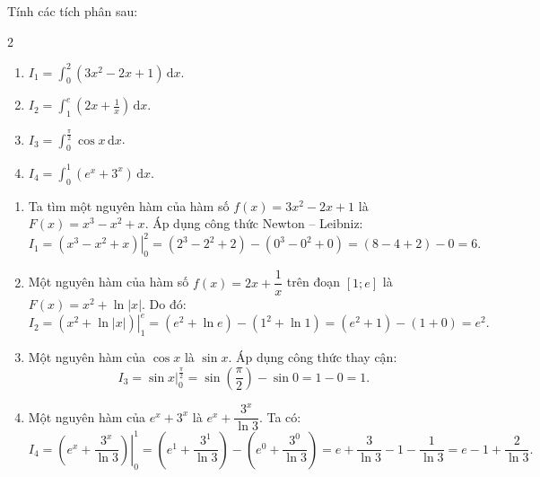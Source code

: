 \documentclass[12pt]{article}
\begin{document}
	
	\begin{vidu}
		Tính các tích phân sau:
		\begin{multicols}{2}
			\begin{enumerate}[label=\alph*)]
				\item $I_1 = \displaystyle \int_0^2 (3x^2 - 2x + 1)\,\mathrm{d}x$.
				\item $I_2 = \displaystyle \int_1^e \left( 2x + \frac{1}{x} \right)\,\mathrm{d}x$.
				\item $I_3 = \displaystyle \int_0^{\frac{\pi}{2}} \cos x\,\mathrm{d}x$.
				\item $I_4 = \displaystyle \int_0^1 (e^x + 3^x)\,\mathrm{d}x$.
			\end{enumerate}
		\end{multicols}
	\end{vidu}
	\begin{loigiai}
		\begin{enumerate}[label=\alph*)]
			\item Ta tìm một nguyên hàm của hàm số $f(x) = 3x^2 - 2x + 1$ là $F(x) = x^3 - x^2 + x$. Áp dụng công thức Newton -- Leibniz:
			\[
			I_1 = \left. (x^3 - x^2 + x) \right|_0^2 = (2^3 - 2^2 + 2) - (0^3 - 0^2 + 0) = (8 - 4 + 2) - 0 = 6.
			\]
			
			\item Một nguyên hàm của hàm số $f(x) = 2x + \dfrac{1}{x}$ trên đoạn $[1; e]$ là $F(x) = x^2 + \ln|x|$. Do đó:
			\[
			I_2 = \left. (x^2 + \ln|x|) \right|_1^e = (e^2 + \ln e) - (1^2 + \ln 1) = (e^2 + 1) - (1 + 0) = e^2.
			\]
			
			\item Một nguyên hàm của $\cos x$ là $\sin x$. Áp dụng công thức thay cận:
			\[
			I_3 = \left. \sin x \right|_0^{\frac{\pi}{2}} = \sin\left(\frac{\pi}{2}\right) - \sin 0 = 1 - 0 = 1.
			\]
			
			\item Một nguyên hàm của $e^x + 3^x$ là $e^x + \dfrac{3^x}{\ln 3}$. Ta có:
			\[
			I_4 = \left. \left( e^x + \frac{3^x}{\ln 3} \right) \right|_0^1 = \left( e^1 + \frac{3^1}{\ln 3} \right) - \left( e^0 + \frac{3^0}{\ln 3} \right) = e + \frac{3}{\ln 3} - 1 - \frac{1}{\ln 3} = e - 1 + \frac{2}{\ln 3}.
			\]
		\end{enumerate}
	\end{loigiai}
	
\end{document}
